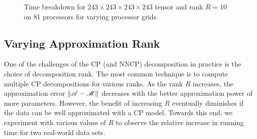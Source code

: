 \begin{figure}
\renewcommand{\datafile}{data/comm_sweep_scale_pgf_10.dat}
\renewcommand{\numiterations}{10}
\caption{Time breakdown for $243\times243\times243\times243$ tensor and rank $R=10$ on 81 processors for varying processor grids.}
\label{fig:commsweep10}
\end{figure}

\subsection{Varying Approximation Rank}

One of the challenges of the CP (and NNCP) decomposition in practice is the choice of decomposition rank.
The most common technique is to compute multiple CP decompositions for various ranks.
As the rank $R$ increases, the approximation error  $\|\TA - \T{M}\|$ decreases with the better approximation power of more parameters. 
However, the benefit of increasing $R$ eventually diminishes if the data can be well approximated with a CP model.
Towards this end, we experiment with various values of $R$ to observe the relative increase in running time for two real-world data sets. 

